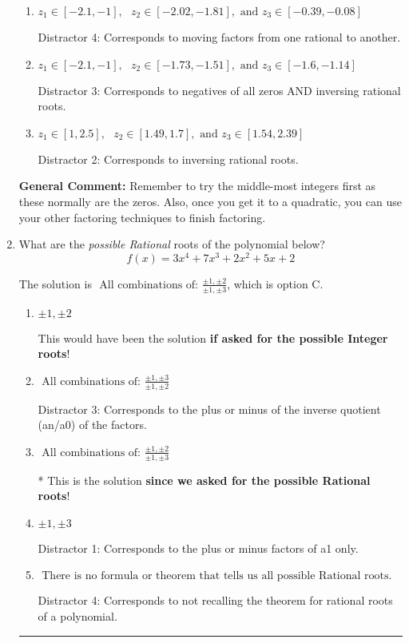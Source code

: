 \documentclass{extbook}[14pt]
\newcommand{\litem}[1]{\item #1

\rule{\textwidth}{0.4pt}}
\begin{document}
\begin{enumerate}
{\begin{enumerate}[label=\Alph*.]
* This is the solution!
\item \( z_1 \in [-2.1, -1], \text{   }  z_2 \in [-2.02, -1.81], \text{   and   } z_3 \in [-0.39, -0.08] \)

 Distractor 4: Corresponds to moving factors from one rational to another.
\item \( z_1 \in [-2.1, -1], \text{   }  z_2 \in [-1.73, -1.51], \text{   and   } z_3 \in [-1.6, -1.14] \)

 Distractor 3: Corresponds to negatives of all zeros AND inversing rational roots.
\item \( z_1 \in [1, 2.5], \text{   }  z_2 \in [1.49, 1.7], \text{   and   } z_3 \in [1.54, 2.39] \)

 Distractor 2: Corresponds to inversing rational roots.
\end{enumerate}

\textbf{General Comment:} Remember to try the middle-most integers first as these normally are the zeros. Also, once you get it to a quadratic, you can use your other factoring techniques to finish factoring.
}
\litem{
What are the \textit{possible Rational} roots of the polynomial below?
\[ f(x) = 3x^{4} +7 x^{3} +2 x^{2} +5 x + 2 \]

The solution is \( \text{ All combinations of: }\frac{\pm 1,\pm 2}{\pm 1,\pm 3} \), which is option C.\begin{enumerate}[label=\Alph*.]
\item \( \pm 1,\pm 2 \)

This would have been the solution \textbf{if asked for the possible Integer roots}!
\item \( \text{ All combinations of: }\frac{\pm 1,\pm 3}{\pm 1,\pm 2} \)

 Distractor 3: Corresponds to the plus or minus of the inverse quotient (an/a0) of the factors. 
\item \( \text{ All combinations of: }\frac{\pm 1,\pm 2}{\pm 1,\pm 3} \)

* This is the solution \textbf{since we asked for the possible Rational roots}!
\item \( \pm 1,\pm 3 \)

 Distractor 1: Corresponds to the plus or minus factors of a1 only.
\item \( \text{ There is no formula or theorem that tells us all possible Rational roots.} \)

 Distractor 4: Corresponds to not recalling the theorem for rational roots of a polynomial.
\end{enumerate}

}
\end{enumerate}
\end{document}
